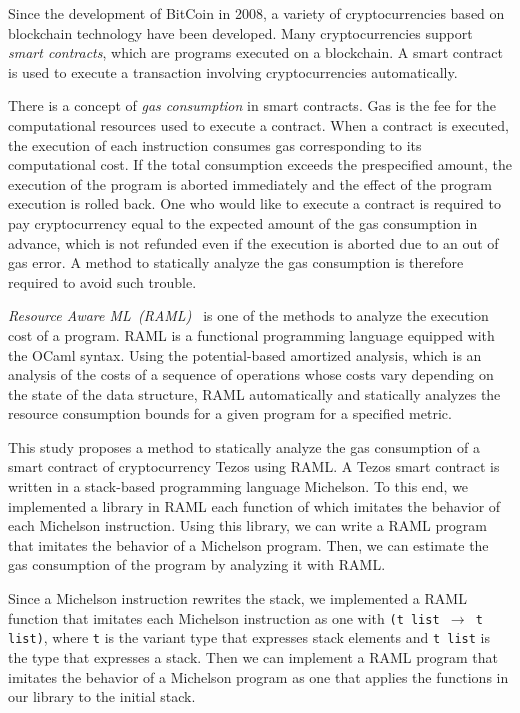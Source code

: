 \documentclass{kuisthesis}
\begin{document}
\begin{eabstract}
Since the development of BitCoin in 2008, a variety of cryptocurrencies based on blockchain technology have been developed. 
Many cryptocurrencies support \emph{smart contracts}, which are programs executed on a blockchain.
A smart contract is used to execute a transaction involving cryptocurrencies automatically.

There is a concept of \emph{gas consumption} in smart contracts. 
Gas is the fee for the computational resources used to execute a contract.
When a contract is executed,  the execution of each instruction consumes gas corresponding to its computational cost.
If the total consumption exceeds the prespecified amount, the execution of the program is aborted immediately and the effect of the program execution is rolled back.
One who would like to execute a contract is required to pay cryptocurrency equal to the expected amount of the gas consumption in advance, which is not refunded even if the execution is aborted due to an out of gas error.
A method to statically analyze the gas consumption is therefore required to avoid such trouble.

\emph{Resource Aware ML\ (RAML)\ } is one of the methods to analyze the execution cost of a program.
RAML is a functional programming language equipped with the OCaml syntax.
Using the potential-based amortized analysis, which is an analysis of the costs of a sequence of operations whose costs vary depending on the state of the data structure,
RAML automatically and statically analyzes the resource consumption bounds for a given program for a specified metric.

This study proposes a method to statically analyze the gas consumption of a smart contract of cryptocurrency Tezos using RAML.
A Tezos smart contract is written in a stack-based programming language Michelson.
To this end, we implemented a library in RAML each function of which imitates the behavior of each Michelson instruction.
Using this library, we can write a RAML program that imitates the behavior of a Michelson program.
Then, we can estimate the gas consumption of the program by analyzing it with RAML.

Since a Michelson instruction rewrites the stack, we implemented a RAML function that imitates each Michelson instruction as one with {\tt (t list $\rightarrow $ t list)}, where {\tt t} is the variant type that expresses stack elements and {\tt t list} is the type that expresses a stack.
Then we can implement a RAML program that imitates the behavior of a Michelson program as one that applies the functions in our library to the initial stack.


\end{eabstract}
\end{document}
